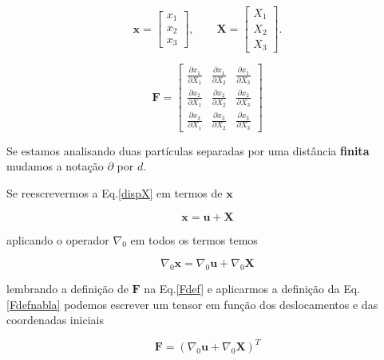 \begin{equation}
	\mathbf{x} = \left[\begin{array}{ccc}
		x_1 \\ x_2 \\ x_3
	\end{array}\right],
	\qquad
	\mathbf{X} = \left[\begin{array}{ccc}
		X_1 \\ X_2 \\ X_3
	\end{array}\right].
\end{equation}

\begin{equation}
	\mathbf{F} = 
	\left[\begin{array}{ccc}
		\frac{\partial x_1}{\partial X_1} 
		& \frac{\partial x_1}{\partial X_2}
		& \frac{\partial x_1}{\partial X_3}
		\\
		\frac{\partial x_2}{\partial X_1} 
		& \frac{\partial x_2}{\partial X_2}
		& \frac{\partial x_2}{\partial X_3}
		\\ 
		\frac{\partial x_3}{\partial X_1} 
		& \frac{\partial x_3}{\partial X_2}
		& \frac{\partial x_3}{\partial X_3}
	\end{array}\right]
\end{equation}

Se estamos analisando duas partículas separadas por uma distância \textbf{finita} mudamos a notação $\partial$ por $d$.

Se reescrevermos a Eq.\eqref{dispX} em termos de $\mathbf{x}$

\begin{equation}
	\mathbf{x} =  \mathbf{u} + \mathbf{X}
\end{equation}

aplicando o operador $\nabla_0$ em todos os termos temos

\begin{equation}
	\nabla_0 \mathbf{x} =  \nabla_0 \mathbf{u} + \nabla_0 \mathbf{X} 
	\label{Fdefnabla}
\end{equation}

lembrando a definição de $\mathbf{F}$ na Eq.\eqref{Fdef} e aplicarmos a definição da Eq.\eqref{Fdefnabla} podemos escrever um tensor em função dos deslocamentos e das coordenadas iniciais

\begin{equation}
	\mathbf{F} = (\nabla_0 \mathbf{u} + \nabla_0 \mathbf{X})^T
\end{equation}

